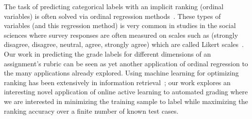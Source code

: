 The task of predicting categorical labels with an implicit ranking (ordinal
variables) is often solved via ordinal regression
methods~\cite{McCullagh:1980}. These types of variables (and this
regression method) is very common in studies in the social sciences where
survey responses are often measured on scales such as (strongly disagree,
disagree, neutral, agree, strongly agree) which are called Likert
scales~\cite{Likert:1932}. Our work in predicting the grade labels for
different dimensions of an assignment's rubric can be seen as yet another
application of ordinal regression to the many applications already
explored. Using machine learning for optimizing ranking has been 
extensively in information retrieval~\cite{Liu:2009}; our work explores 
an interesting novel application of online active learning to automated grading 
where we are interested in minimizing the training sample to label
while maximizing the ranking accuracy over a finite number of known test cases.  





